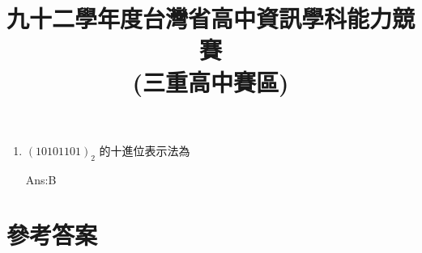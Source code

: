 \documentclass[12pt,a4paper]{report}
\begin{document}
\begin{CJK}{UTF8}{bkai}

\renewcommand{\figurename}{圖}
\renewcommand{\tablename}{表}
\renewcommand{\contentsname}{目~錄~}
\renewcommand{\listfigurename}{插~圖~目~錄}
\renewcommand{\listtablename}{表~格~目~錄}
\renewcommand{\appendixname}{附~錄}
\renewcommand{\bibname}{參~考~文~獻}     %
\renewcommand{\indexname}{索~引}
\renewcommand{\today}{\number\year~年~\number\month~月~\number\day~日}

\title{九十二學年度台灣省高中資訊學科能力競賽\\(三重高中賽區)}
\date{}
\maketitle

\begin{enumerate}
\item ${(10101101)}_2$ 的十進位表示法為
  Ans:B
\end{enumerate}

\newpage

\section*{參考答案}


\end{CJK}
\end{document}
